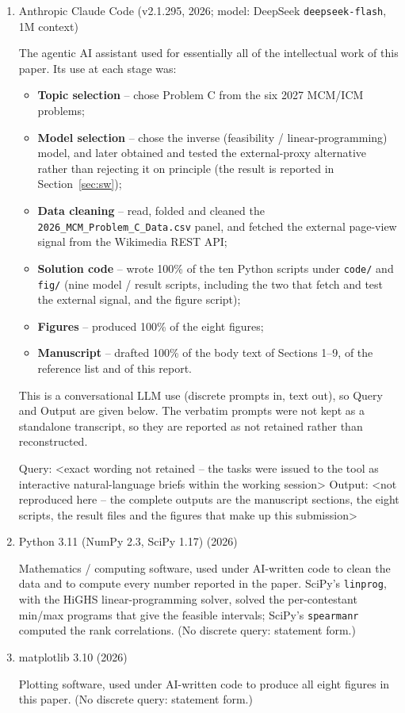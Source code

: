 \begin{enumerate}
  \item Anthropic Claude Code (v2.1.295, 2026; model: DeepSeek \texttt{deepseek-flash}, 1M context)

  The agentic AI assistant used for essentially all of the intellectual work of
  this paper.  Its use at each stage was:
  \begin{itemize}
    \item \textbf{Topic selection} -- chose Problem C from the six 2027 MCM/ICM problems;
    \item \textbf{Model selection} -- chose the inverse (feasibility / linear-programming) model, and later obtained and tested the external-proxy alternative rather than rejecting it on principle (the result is reported in Section~\ref{sec:sw});
    \item \textbf{Data cleaning} -- read, folded and cleaned the \texttt{2026\_MCM\_Problem\_C\_Data.csv} panel, and fetched the external page-view signal from the Wikimedia REST API;
    \item \textbf{Solution code} -- wrote 100\% of the ten Python scripts under \texttt{code/} and \texttt{fig/} (nine model / result scripts, including the two that fetch and test the external signal, and the figure script);
    \item \textbf{Figures} -- produced 100\% of the eight figures;
    \item \textbf{Manuscript} -- drafted 100\% of the body text of Sections 1--9, of the reference list and of this report.
  \end{itemize}
  This is a conversational LLM use (discrete prompts in, text out), so Query and
  Output are given below.  The verbatim prompts were not kept as a standalone
  transcript, so they are reported as not retained rather than reconstructed.

  Query: <exact wording not retained -- the tasks were issued to the tool as
    interactive natural-language briefs within the working session>
  Output: <not reproduced here -- the complete outputs are the manuscript
    sections, the eight scripts, the result files and the figures that make up
    this submission>

  \item Python 3.11 (NumPy 2.3, SciPy 1.17) (2026)

  Mathematics / computing software, used under AI-written code to clean the data
  and to compute every number reported in the paper.  SciPy's \texttt{linprog},
  with the HiGHS linear-programming solver, solved the per-contestant min/max
  programs that give the feasible intervals; SciPy's \texttt{spearmanr} computed
  the rank correlations.  (No discrete query: statement form.)

  \item matplotlib 3.10 (2026)

  Plotting software, used under AI-written code to produce all eight figures in
  this paper.  (No discrete query: statement form.)
\end{enumerate}

